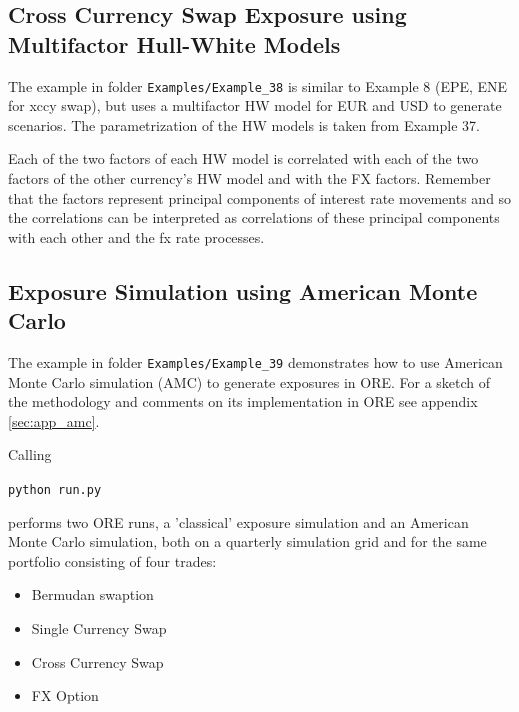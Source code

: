 \documentclass[12pt, a4paper]{article}
\begin{document}
\subsection{Cross Currency Swap Exposure using Multifactor Hull-White Models}%
\label{example:38}

The example in folder {\tt Examples/Example\_38} is similar to Example 8 (EPE, ENE for xccy swap), but uses a
multifactor HW model for EUR and USD to generate scenarios. The parametrization of the HW models is taken from Example
37.

Each of the two factors of each HW model is correlated with each of the two factors of the other currency's HW model and
with the FX factors. Remember that the factors represent principal components of interest rate movements and so the
correlations can be interpreted as correlations of these principal components with each other and the fx rate processes.

\subsection{Exposure Simulation using American Monte Carlo}%
\label{example:39}

The example in folder {\tt Examples/Example\_39} demonstrates how to use American Monte Carlo simulation (AMC) to generate exposures in ORE.
For a sketch of the methodology and comments on its implementation in ORE see appendix \ref{sec:app_amc}.

Calling 

\medskip
\centerline {\tt python run.py} 

\medskip
performs two ORE runs, a 'classical' exposure simulation and an American Monte Carlo simulation, both on a quarterly simulation grid and for the same portfolio consisting of four trades:

\begin{itemize}
\item Bermudan swaption
\item Single Currency Swap
\item Cross Currency Swap
\item FX Option
\end{itemize}
\end{document}
